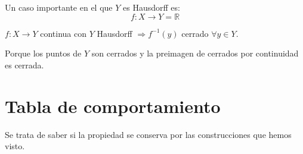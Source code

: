 \begin{ej}[Importante]
Un caso importante en el que $Y$ es Hausdorff es: 
\[
f: X \rightarrow Y = \mathbb{R}
\]
\end{ej}

\begin{obs}
$f: X \rightarrow Y$ continua con $Y$ Hausdorff $\Rightarrow f^{-1}\left( y \right)$ cerrado $\forall y \in Y$.
\begin{demo}
Porque los puntos de $Y$ son cerrados y la preimagen de cerrados por continuidad es cerrada.
\end{demo}
\end{obs}

\section{Tabla de comportamiento}%
\label{sec:tabla_de_comportamiento}
Se trata de saber si la propiedad se conserva por las construcciones que hemos visto.

